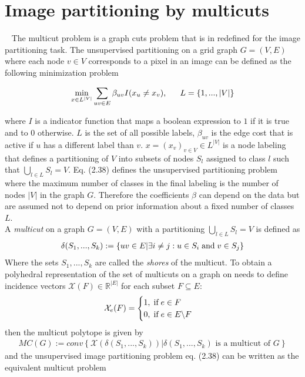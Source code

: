 \section{Image partitioning by multicuts}~\label{sec:multicut}
The multicut problem is a graph cuts problem that is in \cite{10.1007/978-3-642-23094-3_3} redefined for the image partitioning task. The unsupervised partitioning on a grid graph $G=(V, E)$ where each node $v \in V$ corresponds to a pixel in an image can be defined as the following minimization problem

\begin{align}
	\min_{x \in L^{|V|}} \sum_{uv \in E} \beta_{uv} I(x_u \neq x_v) \text{, \hspace{5mm}} L=\{ 1, ..., |V| \}
\end{align}

where $I$ is a indicator function that maps a boolean expression to $1$ if it is true and to $0$ otherwise. $L$ is the set of all possible labels, $\beta_{uv}$ is the edge cost that is active if $u$ has a different label than $v$. $x=(x_v)_{v\in V} \in L^{|V|}$ is a node labeling that defines a partitioning of $V$ into subsets of nodes $S_l$ assigned to class $l$ such that $\bigcup_{l \in L} S_l = V$. Eq. (2.38) defines the unsupervised partitioning problem where the maximum number of classes in the final labeling is the number of nodes $|V|$ in the graph $G$. Therefore the coefficients $\beta$ can depend on the data but are assumed not to depend on prior information about a fixed number of classes $L$. \\
A \emph{multicut} on a graph $G=(V,E)$ with a partitioning $\bigcup_{l \in L} S_l = V$ is defined as 
\begin{align}
	\delta(S_1, ..., S_k) := \left\{ uv \in E | \exists i \neq j : u \in S_i \text{\hspace{1mm}and\hspace{1mm}} v \in S_j \right\}
\end{align}
Where the sets $S_1, ..., S_k$ are called the \emph{shores} of the multicut.
To obtain a polyhedral representation of the set of multicuts on a graph on needs to define incidence vectors $\mathcal{X}(F) \in \mathbb{R}^{|E|}$ for each subset $F \subseteq E$:
\begin{align}
	\mathcal{X}_e(F) = \begin{cases}
	1, \text{\hspace{1mm}if\hspace{1mm}} e \in F \\
	0, \text{\hspace{1mm}if\hspace{1mm}} e \in E \backslash F
	\end{cases}
\end{align}
then the multicut polytope is given by
\begin{align}
	MC(G) := conv\left\{ \mathcal{X}(\delta (S_1, ..., S_k)) | \delta (S_1, ..., S_k) \text{ is a multicut of } G \right\}
\end{align}
and the unsupervised image partitioning problem eq. (2.38) can be written as the equivalent multicut problem

